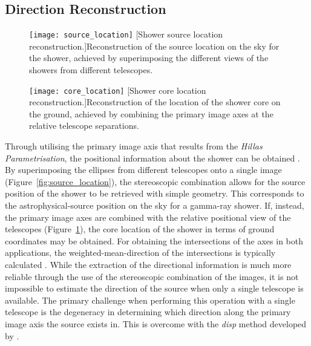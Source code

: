 \subsection{Direction Reconstruction}

\begin{figure}
\begin{minipage}[t]{.49\textwidth}
  \centering
  \texttt{[image: source\_location]} 
  [Shower source location reconstruction.]{Reconstruction of the source location on the sky for the shower, achieved by superimposing the different views of the showers from different telescopes.}
  \label{fig:source_location}
\end{minipage}%
\hfill
\begin{minipage}[t]{.49\textwidth}
  \centering
  \texttt{[image: core\_location]}
  [Shower core location reconstruction.]{Reconstruction of the location of the shower core on the ground, achieved by combining the primary image axes at the relative telescope separations.}
  \label{fig:core_location}
\end{minipage}
\end{figure}

Through utilising the primary image axis that results from the \textit{Hillas Parametrisation}, the positional information about the shower can be obtained \cite{Daum1997,Cogan2006,Dickinson2010}. By superimposing the ellipses from different telescopes onto a single image (Figure~\ref{fig:source_location}), the stereoscopic combination allows for the source position of the shower to be retrieved with simple geometry. This corresponds to the astrophysical-source position on the sky for a gamma-ray shower. If, instead, the primary image axes are combined with the relative positional view of the telescopes (Figure~\ref{fig:core_location}), the core location of the shower in terms of ground coordinates may be obtained. For obtaining the intersections of the axes in both applications, the weighted-mean-direction of the intersections is typically calculated \cite{Eschbach2016,Bernlohr2013a}. While the extraction of the directional information is much more reliable through the use of the stereoscopic combination of the images, it is not impossible to estimate the direction of the source when only a single telescope is available. The primary challenge when performing this operation with a single telescope is the degeneracy in determining which direction along the primary image axis the source exists in. This is overcome with the \textit{disp} method developed by \textcite{Lessard2001}.

